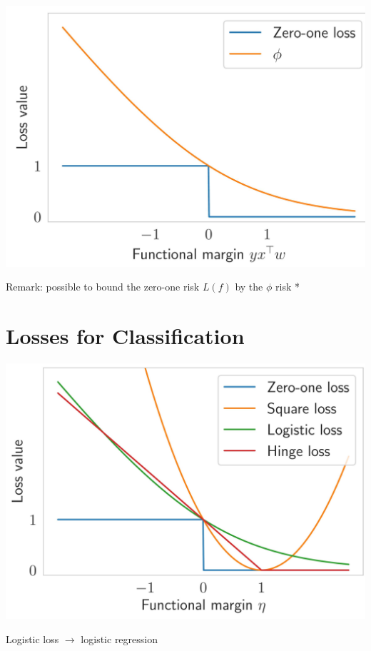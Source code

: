 \documentclass[10pt]{article}
\begin{document}
\begin{center}
\includegraphics[max width=\textwidth]{2023_12_30_cf784c471dfd1dd5afbag-32}
\end{center}

Remark: possible to bound the zero-one risk $L(f)$ by the $\phi$ risk *

\section*{Losses for Classification}
\begin{center}
\includegraphics[max width=\textwidth]{2023_12_30_cf784c471dfd1dd5afbag-33}
\end{center}

Logistic loss $\rightarrow$ logistic regression
\end{document}
